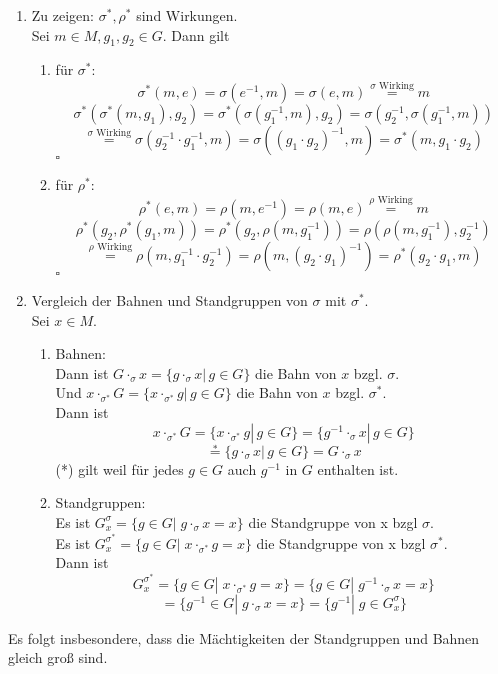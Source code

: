 \documentclass[11pt,a4paper,ngerman]{article}
\begin{document}
\begin{enumerate}[\bfseries i)]
\item Zu zeigen: $\sigma^{*}, \rho^{*}$ sind Wirkungen. \\
Sei $m \in M, g_1, g_2 \in G$. Dann gilt
\begin{enumerate}[\bfseries (1)]
\item für $\sigma^{*}$: \\
$$ \sigma^{*}(m,e) = \sigma(e^{-1},m) = \sigma(e,m) \stackrel{\sigma \text{ Wirking}}{=} m $$
$$ \sigma^{*}(\sigma^{*}(m,g_1),g_2) = \sigma^{*}(\sigma(g_1^{-1},m),g_2) = \sigma(g_2^{-1},\sigma(g_1^{-1},m)) $$
$$
\stackrel{\sigma \text{ Wirking}}{=} \sigma(g_2^{-1}\cdot g_1^{-1},m) 
= \sigma((g_1 \cdot g_2)^{-1},m) = \sigma^{*}(m,g_1 \cdot g_2)
$$
\mbox{} \hfill $\square$
\item für $\rho^{*}$: \\
$$ \rho^{*}(e,m) = \rho(m,e^{-1}) = \rho(m,e) \stackrel{\rho \text{ Wirking}}{=} m $$
$$ \rho^{*}(g_2,\rho^{*}(g_1,m)) = \rho^{*}(g_2,\rho(m,g_1^{-1})) = \rho(\rho(m,g_1^{-1}),g_2^{-1}) $$
$$
\stackrel{\rho \text{ Wirking}}{=} \rho(m,g_1^{-1}\cdot g_2^{-1}) 
= \rho(m,(g_2 \cdot g_1)^{-1}) = \rho^{*}(g_2 \cdot g_1,m)
$$
\mbox{} \hfill $\square$

\end{enumerate}

\item Vergleich der Bahnen und Standgruppen von $\sigma$ mit $\sigma^{*}$. \\
Sei $x \in M$.
\begin{enumerate}[\bfseries (1)]
\item Bahnen: \\
Dann ist $G \cdot_{\sigma} x = \{ g \cdot_{\sigma} x | \, g \in G \}$ die Bahn von $x$ bzgl. $\sigma$. \\
Und $x \cdot_{\sigma^{*}} G  = \{ x \cdot_{\sigma^{*}} g | \, g \in G \}$ die Bahn von $x$ bzgl. $\sigma^{*}$. \\
Dann ist 
$$ x \cdot_{\sigma^{*}} G = \{ x \cdot_{\sigma^{*}} g | \, g \in G \} = \{ g^{-1} \cdot_{\sigma} x | \, g \in G \} $$
$$ \stackrel{*}{=} \{ g  \cdot_{\sigma} x | \, g \in G \} =  G \cdot_{\sigma} x $$
(*) gilt weil für jedes $g \in G$ auch $g^{-1}$ in $G$ enthalten ist.  \\
\item Standgruppen: \\
Es ist $G^{\sigma}_x = \{ g \in G | \; g \cdot_{\sigma} x = x \}$ die Standgruppe von x bzgl $\sigma$. \\
Es ist $G^{\sigma^{*}}_x = \{ g \in G | \; x \cdot_{\sigma^{*}} g = x \}$ die Standgruppe von x bzgl $\sigma^{*}$. \\
Dann ist
$$ G^{\sigma^{*}}_x = \{ g \in G | \; x \cdot_{\sigma^{*}} g = x \} = \{ g \in G | \; g^{-1} \cdot_{\sigma} x = x \} $$
$$ = \{ g^{-1} \in G | \; g \cdot_{\sigma} x = x \} = \{ g^{-1} | \; g \in G^{\sigma}_x \}$$
\end{enumerate}
\end{enumerate}
Es folgt insbesondere, dass die Mächtigkeiten der Standgruppen und Bahnen gleich groß sind.
\end{document}
